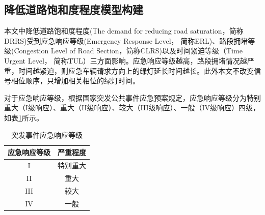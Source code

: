 \subsection{降低道路饱和度程度模型构建}

本文中降低道路饱和度程度(The demand for reducing road saturation，简称DRRS)受到应急响应等级(Emergency Response Level， 简称ERL)、路段拥堵等级(Congestion Level of Road Section，简称CLRS)以及时间紧迫等级（Time Urgent Level， 简称TUL）三方面影响。应急响应等级越高，路段拥堵情况越严重，时间越紧迫，则应急车辆请求方向上的绿灯延长时间越长。此外本文不改变信号相位顺序，只增加相关相位的绿灯时间。



对于应急响应等级，根据国家突发公共事件应急预案规定\cite{erl_2019}，应急响应等级分为特别重大（I级响应）、重大（II级响应）、较大（III级响应）、一般（IV级响应）四级，如表\ref{table:ERL}所示。
\begin{table}[H]
	\centering
	\caption{突发事件应急响应等级}
	\label{table:ERL}
	\begin{tabular}{|c|c|}
		\hline
		应急响应等级 & 严重程度 \\ \hline
		I & 特别重大 \\ \hline
		II & 重大 \\ \hline
		III & 较大 \\ \hline
		IV & 一般 \\ \hline
	\end{tabular}
\end{table}



